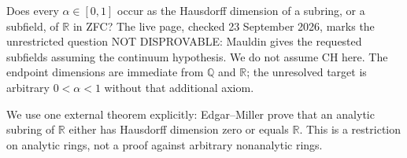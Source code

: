 Does every $\alpha\in[0,1]$ occur as the Hausdorff dimension of a subring, or a subfield, of $\mathbb R$ in ZFC? The live page, checked 23 September 2026, marks the unrestricted question NOT DISPROVABLE: Mauldin gives the requested subfields assuming the continuum hypothesis. We do not assume CH here. The endpoint dimensions are immediate from $\mathbb Q$ and $\mathbb R$; the unresolved target is arbitrary $0<\alpha<1$ without that additional axiom.

We use one external theorem explicitly: Edgar--Miller prove that an analytic subring of $\mathbb R$ either has Hausdorff dimension zero or equals $\mathbb R$. This is a restriction on analytic rings, not a proof against arbitrary nonanalytic rings.
